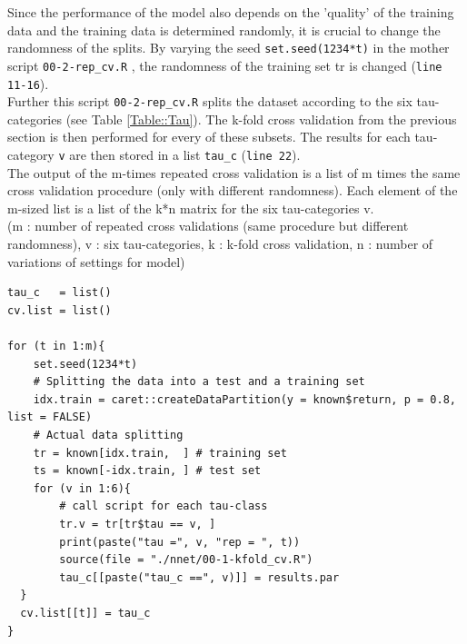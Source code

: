 \documentclass[a4paper,12pt]{article}
\begin{document}
Since the performance of the model also depends on the 'quality' of the training data and the training data is determined randomly, it is crucial to change the randomness of the splits. By varying the seed \texttt{set.seed(1234*t)} in the mother script  \texttt{00-2-rep\_cv.R} , the randomness of the training set tr is changed (\texttt{line 11-16}). \\ 
Further this script \texttt{00-2-rep\_cv.R} splits the dataset according to the six tau-categories (see Table \ref{Table::Tau}). The k-fold cross validation from the previous section is then performed for every of these subsets. The results for each tau-category \texttt{v} are then stored in a list \texttt{tau\_c} (\texttt{line 22}). \\
The output of the m-times repeated cross validation is a list of m times the same cross validation procedure (only with different randomness). Each element of the m-sized list is a list of the k*n matrix for the six tau-categories v.\\
(m : number of repeated cross validations (same procedure but different randomness), v : six tau-categories, k : k-fold cross validation, n : number of variations of settings for model)\\ 

\begin{lstlisting}
tau_c   = list()
cv.list = list()

for (t in 1:m){
    set.seed(1234*t)
    # Splitting the data into a test and a training set 
    idx.train = caret::createDataPartition(y = known$return, p = 0.8, list = FALSE)
    # Actual data splitting
    tr = known[idx.train,  ] # training set
    ts = known[-idx.train, ] # test set
    for (v in 1:6){
        # call script for each tau-class
        tr.v = tr[tr$tau == v, ]
        print(paste("tau =", v, "rep = ", t))
        source(file = "./nnet/00-1-kfold_cv.R")
        tau_c[[paste("tau_c ==", v)]] = results.par
  }
  cv.list[[t]] = tau_c
}
\end{lstlisting}
\end{document}
